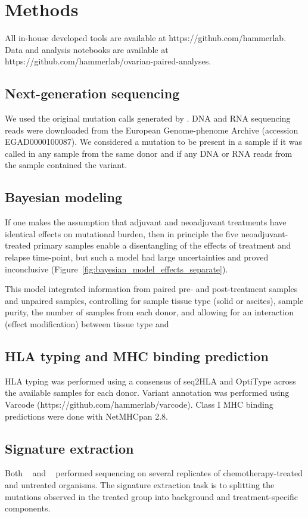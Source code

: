 \section*{Methods}
All in-house developed tools are available at https://github.com/hammerlab. Data and analysis notebooks are available at https://github.com/hammerlab/ovarian-paired-analyses.

\subsection*{Next-generation sequencing}
We used the original mutation calls generated by \cite{Patch_2015}. DNA and RNA sequencing reads were downloaded from the European Genome-phenome Archive (accession EGAD0000100087). We considered a mutation to be present in a sample if it was called in any sample from the same donor and if any DNA or RNA reads from the sample contained the variant.

\subsection*{Bayesian modeling}
If one makes the assumption that adjuvant and neoadjuvant treatments have identical effects on mutational burden, then in principle the five neoadjuvant-treated primary samples enable a disentangling of the effects of treatment and relapse time-point, but such a model had large uncertainties and proved inconclusive (Figure~\ref{fig:bayesian_model_effects_separate}). 

This model integrated information from paired pre- and post-treatment samples and unpaired samples, controlling for sample tissue type (solid or ascites), sample purity, the number of samples from each donor, and allowing for an interaction (effect modification) between tissue type and 
 
\subsection*{HLA typing and MHC binding prediction}
HLA typing was performed using a consensus of seq2HLA\cite{Boegel_2012} and OptiType\cite{Szolek_2014} across the available samples for each donor. Variant annotation was performed using Varcode (https://github.com/hammerlab/varcode). Class I MHC binding predictions were done with NetMHCpan 2.8\cite{Lundegaard_2008}.

\subsection*{Signature extraction}
Both ~\cite{Meier_2014} and ~\cite{Szikriszt_2016} performed sequencing on several replicates of chemotherapy-treated and untreated organisms. The signature extraction task is to splitting the mutations observed in the treated group into background and treatment-specific components.

